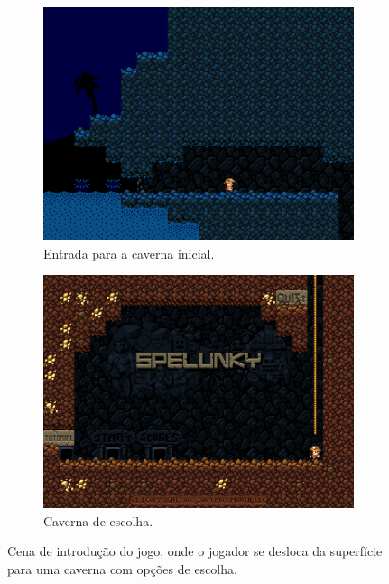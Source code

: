 \begin{figure}[H]
\centering
	\begin{subfigure}[b]{0.4\textwidth}
		\includegraphics[width=\textwidth]{fig/spelunky-intro-screen.pdf}
		\caption{Entrada para a caverna inicial.}
		\label{fig:spelunky-intro-screen}
	\end{subfigure}
	\begin{subfigure}[b]{0.4\textwidth}
		\includegraphics[width=\textwidth]{fig/spelunky-initial-screen.pdf}
		\caption{Caverna de escolha.}
		\label{fig:spelunky-initial-screen}
	\end{subfigure}

    \caption{Cena de introdução do jogo, onde o jogador se desloca da
    superfície para uma caverna com opções de escolha.}
	\label{fig:spelunky-introduction}
\end{figure}

